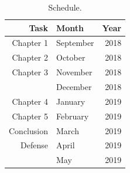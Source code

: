 \documentclass[12pt,twoside,a4paper]{book}
\numberwithin{equation}{section}
\theoremstyle{remark}
\begin{document}
\begin{table}[h]
\centering

\begin{tabular}{|r|lr|}
\hline
Task & Month&Year \\ 
\hline                               
Chapter 1& September & 2018 \\
Chapter 2 &October & 2018 \\
Chapter 3&November & 2018 \\
 &December & 2018 \\
Chapter 4&January & 2019 \\
Chapter 5&February & 2019 \\
Conclusion&March & 2019 \\
Defense&April & 2019 \\
 &May & 2019   \\ 
\hline
\end{tabular}
\caption{Schedule.}
\label{tab:schedule}
\end{table}



\end{document}
